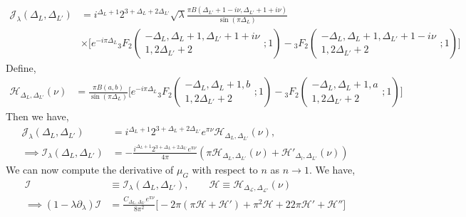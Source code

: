 \documentclass[11pt]{article}
\newcommand{\p}{\partial}
\newcommand{\nn}{\nonumber}
\newcommand{\lb}{\left(}
\newcommand{\rb}{\right)}
\begin{document}
\begin{align}
    \mathcal{J}_\lambda(\Delta_L,\Delta_{L'}) &= i^{\Delta_L+1}2^{3+\Delta_L+2\Delta_{L'}}\sqrt \lambda \frac{\pi B(\Delta_{L'}+1-i\nu,\Delta_{L'}+1+i\nu)}{\sin(\pi \Delta_L)} \nn\\
    &\times \Bigg[ e^{-i\pi \Delta_L} {}_3F_2\lb \begin{matrix}
        -\Delta_L , \Delta_L+1,\Delta_{L'}+1+i\nu \\1,2\Delta_{L'}+2
    \end{matrix};1\rb - {}_3F_2\lb \begin{matrix}
        -\Delta_L , \Delta_L+1,\Delta_{L'}+1-i\nu \\1,2\Delta_{L'}+2
    \end{matrix};1\rb\Bigg]
\end{align}
Define,
\begin{align}
    \mathcal{H}_{\Delta_L,\Delta_{L'}}(\nu) &=  \frac{\pi B(a,b)}{\sin(\pi\Delta_L)}\Bigg[ e^{-i\pi \Delta_L} {}_3F_2\lb \begin{matrix}
        -\Delta_L , \Delta_L+1,b \\1,2\Delta_{L'}+2
    \end{matrix};1\rb - {}_3F_2\lb \begin{matrix}
        -\Delta_L , \Delta_L+1,a \\1,2\Delta_{L'}+2
    \end{matrix};1\rb\Bigg]
\end{align}
Then we have,
\begin{align}
    \mathcal{J}_\lambda(\Delta_L,\Delta_{L'}) &= i^{\Delta_L+1}2^{3+\Delta_L+2\Delta_{L'}}e^{\pi \nu}\mathcal{H}_{\Delta_L,\Delta_{L'}}(\nu),
    \\
    \implies \mathcal{I}_\lambda(\Delta_L,\Delta_{L'})&= -\frac{i^{\Delta_L+1}2^{3+\Delta_L+2\Delta_{L'}}e^{\pi \nu}}{4\pi}\lb \pi \mathcal{H}_{\Delta_L,\Delta_{L'}}(\nu)+ \mathcal{H}'_{\Delta_l,\Delta_{L'}}(\nu)\rb
\end{align}
We can now compute the derivative of $\mu_G$ with respect to $n$ as $n\to 1$. We have,
\begin{align}
    \mathcal{I}&\equiv \mathcal{I}_\lambda(\Delta_L,\Delta_{L'}) ,\qquad \mathcal{H}\equiv \mathcal{H_{\Delta_L,\Delta_{L'}}(\nu)}
    \\
    \implies (1-\lambda\p_\lambda)\mathcal{I} &= \frac{C_{\Delta_L,\Delta_{L'}}e^{\pi\nu}}{8\pi^2}\big[ -2\pi \lb \pi \mathcal{H} + \mathcal{H}'\rb +\pi^2\mathcal{H} + 22\pi \mathcal{H}' + \mathcal{H}'' \big]
\end{align}
\end{document}
